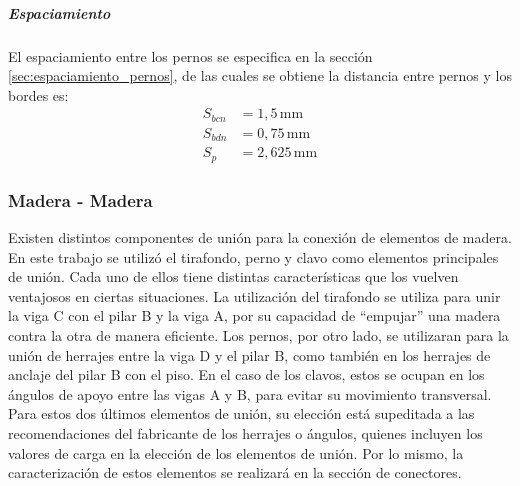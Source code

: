 \subparagraph{Espaciamiento}
El espaciamiento entre los pernos se especifica en la sección \ref{sec:espaciamiento_pernos}, de las cuales se obtiene la distancia entre pernos y los bordes es:
\begin{align*}
	S_{bcn} &= 1,5 \, \text{mm} \\
	S_{bdn} &= 0,75 \, \text{mm} \\
	S_p &= 2,625 \, \text{mm}
\end{align*}


\subsubsection{Madera - Madera}
Existen distintos componentes de unión para la conexión de elementos de madera. En este trabajo se utilizó el tirafondo, perno y clavo como elementos principales de unión.  Cada uno de ellos tiene distintas características que los vuelven ventajosos en ciertas situaciones. La utilización del tirafondo se utiliza para unir la viga C con el pilar B y la viga A, por su capacidad de ``empujar'' una madera contra la otra de manera eficiente. Los pernos, por otro lado, se utilizaran para la unión de herrajes entre la viga D y el pilar B, como también en los herrajes de anclaje del pilar B con el piso. En el caso de los clavos, estos se ocupan en los ángulos de apoyo entre las vigas A y B, para evitar su movimiento transversal. Para estos dos últimos elementos de unión, su elección está supeditada a las recomendaciones del fabricante de los herrajes o ángulos, quienes incluyen los valores de carga en la elección de los elementos de unión. Por lo mismo, la caracterización de estos elementos se realizará en la sección de conectores.

